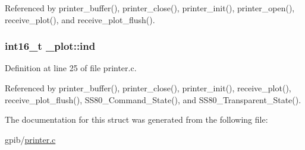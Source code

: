 Referenced by printer\+\_\+buffer(), printer\+\_\+close(), printer\+\_\+init(), printer\+\_\+open(), receive\+\_\+plot(), and receive\+\_\+plot\+\_\+flush().

\subsubsection[{\texorpdfstring{ind}{ind}}]{\setlength{\rightskip}{0pt plus 5cm}int16\+\_\+t \+\_\+plot\+::ind}\hypertarget{struct__plot_ab02a041a2c701b09447d883089abba4f}{}\label{struct__plot_ab02a041a2c701b09447d883089abba4f}


Definition at line 25 of file printer.\+c.



Referenced by printer\+\_\+buffer(), printer\+\_\+close(), printer\+\_\+init(), receive\+\_\+plot(), receive\+\_\+plot\+\_\+flush(), S\+S80\+\_\+\+Command\+\_\+\+State(), and S\+S80\+\_\+\+Transparent\+\_\+\+State().



The documentation for this struct was generated from the following file\+:\begin{DoxyCompactItemize}
\item 
gpib/\hyperlink{printer_8c}{printer.\+c}\end{DoxyCompactItemize}
